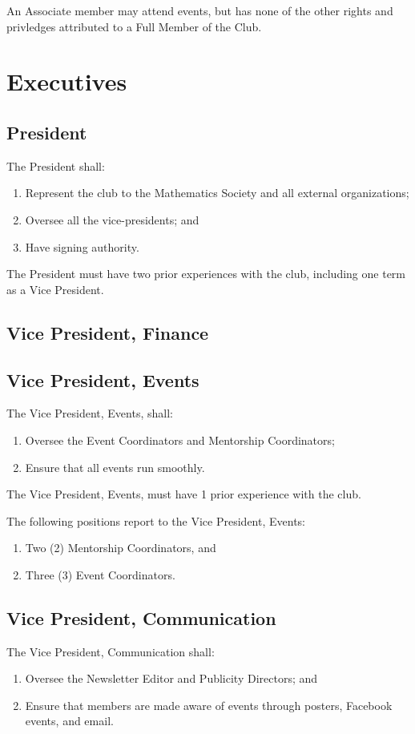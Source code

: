 \documentclass[11pt]{mathsoc}
\begin{document}
An Associate member may attend events, but has none of the other rights
and privledges attributed to a Full Member of the Club.

\section{Executives}

\subsection{President}
The President shall:
\begin{enumerate}
    \item Represent the club to the Mathematics Society and all external 
        organizations; 
    \item Oversee all the vice-presidents; and
    \item Have signing authority.
\end{enumerate}
    
The President must have two prior experiences with the club, including one term 
as a Vice President.

\subsection{Vice President, Finance}

\subsection{Vice President, Events}
The Vice President, Events, shall:
\begin{enumerate}
    \item Oversee the Event Coordinators and Mentorship Coordinators; 
    \item Ensure that all events run smoothly. 
\end{enumerate}

The Vice President, Events, must have 1 prior experience with the club.

The following positions report to the Vice President, Events:
\begin{enumerate}
    \item Two (2) Mentorship Coordinators, and
    \item Three (3) Event Coordinators.
\end{enumerate}

\subsection{Vice President, Communication}
The Vice President, Communication shall:
\begin{enumerate}
    \item Oversee the Newsletter Editor and Publicity Directors; and
    \item Ensure that members are made aware of events through posters, 
        Facebook events, and email. 
\end{enumerate}
\end{document}
